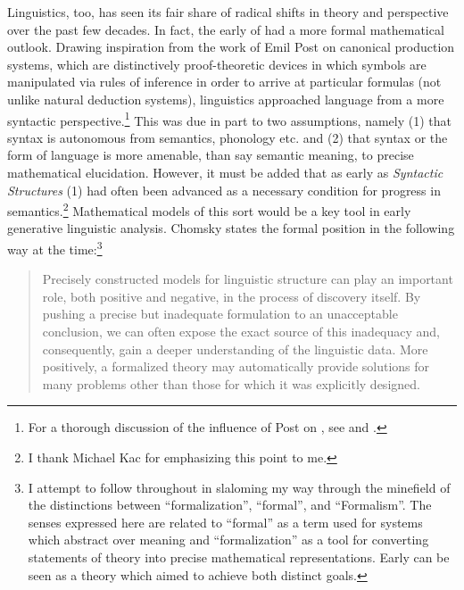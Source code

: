 \documentclass[output=paper]{langscibook}
\begin{document}
Linguistics, too, has seen its fair share of radical shifts in theory and perspective over the past few decades. In fact, the early  of \cite{Chomsky1957} had a more formal mathematical outlook. Drawing inspiration from the work of Emil Post on canonical production systems, which are distinctively proof-theoretic devices in which symbols are manipulated via rules of inference in order to arrive at particular formulas (not unlike natural deduction systems), linguistics approached language from a more syntactic perspective.\footnote{For a thorough discussion of the influence of Post on , see \cite{Pullum2011} and \cite{Lobina2017}.} This was due in part to two assumptions, namely (1) that syntax is autonomous from semantics, phonology etc. and (2) that syntax or the form of language is more amenable, than say semantic meaning, to precise mathematical elucidation. However, it must be added that as early as \textit{Syntactic Structures} (1) had often been advanced as a necessary condition for progress in semantics.\footnote{I thank Michael Kac for emphasizing this point to me.} Mathematical models of this sort would be a key tool in early generative linguistic analysis. Chomsky states the formal position in the following way at the time:\footnote{I attempt to follow \cite{Pullum2007} throughout in slaloming my way through the minefield of the distinctions between ``formalization'', ``formal'', and ``Formalism''. The senses expressed here are related to ``formal'' as a term used for systems which abstract over meaning and ``formalization'' as a tool for converting statements of theory into precise mathematical representations. Early  can be seen as a theory which aimed to achieve both distinct goals.} 

\begin{quote}
Precisely constructed models for linguistic structure can play an important role, both positive and negative, in the process of discovery itself. By pushing a precise but inadequate formulation to an unacceptable conclusion, we can often expose the exact source of this inadequacy and, consequently, gain a deeper understanding of the linguistic data. More positively, a formalized theory may automatically provide solutions for many problems other than those for which it was explicitly designed. \citep[5]{Chomsky1957}
\end{quote}
\end{document}
